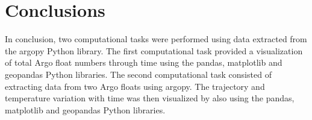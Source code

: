 \documentclass{article}
\begin{document}
 

\section{Conclusions}

In conclusion, two computational tasks were performed using data extracted from the argopy Python library. The first computational task provided a visualization of total Argo float numbers through time using the pandas, matplotlib and geopandas Python libraries. The second computational task consisted of extracting data from two Argo floats using argopy. The trajectory and temperature variation with time was then visualized by also using the pandas, matplotlib and geopandas Python libraries.

\printbibliography
\end{document}
